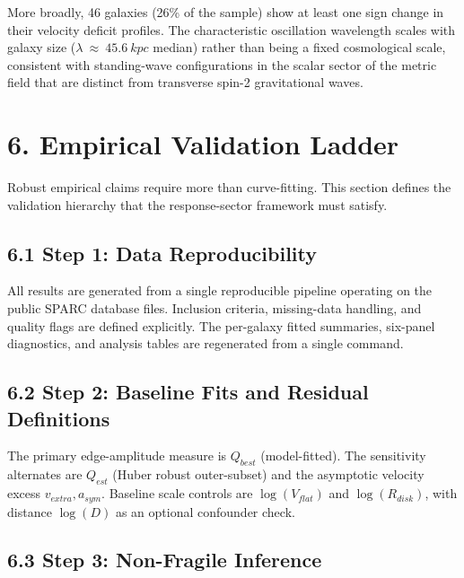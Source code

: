 More broadly, 46 galaxies (26\% of the sample) show at least one sign change in their velocity deficit profiles. The characteristic oscillation wavelength scales with galaxy size (\(\lambda\  \approx \ 45.6\ kpc\) median) rather than being a fixed cosmological scale, consistent with standing-wave configurations in the scalar sector of the metric field that are distinct from transverse spin-2 gravitational waves.

\section{}\label{section-7}

\section{6. Empirical Validation Ladder}\label{empirical-validation-ladder}

Robust empirical claims require more than curve-fitting. This section defines the validation hierarchy that the response-sector framework must satisfy.

\subsection{6.1 Step 1: Data Reproducibility}\label{step-1-data-reproducibility}

All results are generated from a single reproducible pipeline operating on the public SPARC database files. Inclusion criteria, missing-data handling, and quality flags are defined explicitly. The per-galaxy fitted summaries, six-panel diagnostics, and analysis tables are regenerated from a single command.

\subsection{6.2 Step 2: Baseline Fits and Residual Definitions}\label{step-2-baseline-fits-and-residual-definitions}

The primary edge-amplitude measure is \(Q_{best}\) (model-fitted). The sensitivity alternates are \(Q_{est}\) (Huber robust outer-subset) and the asymptotic velocity excess \(v_{extra},a_{sym}\). Baseline scale controls are \(\log\left( V_{flat} \right)\) and \(\log\left( R_{disk} \right)\), with distance \(\log(D)\) as an optional confounder check.

\subsection{6.3 Step 3: Non-Fragile Inference}\label{step-3-non-fragile-inference}

